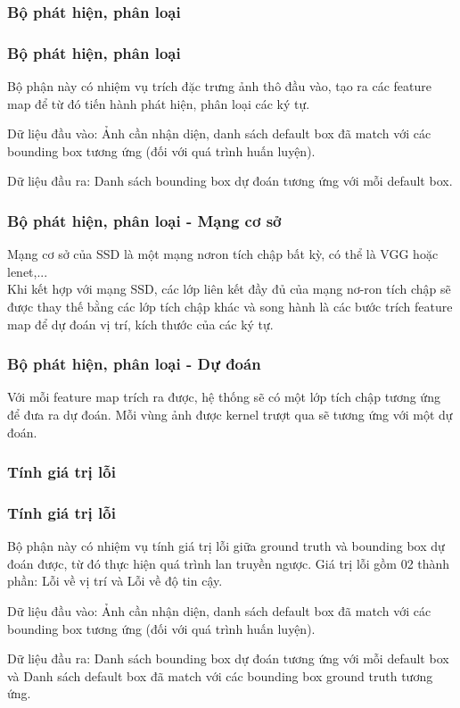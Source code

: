 \documentclass{beamer}
\begin{document}
	
	\subsubsection{Bộ phát hiện, phân loại}
	\begin{frame}
		\frametitle{Bộ phát hiện, phân loại}
		Bộ phận này có nhiệm vụ trích đặc trưng ảnh thô đầu vào, tạo ra các feature map để từ đó tiến hành phát hiện, phân loại các ký tự.
		
		Dữ liệu đầu vào: Ảnh cần nhận diện, danh sách default box đã match với các bounding box tương ứng (đối với quá trình huấn luyện).
		
		Dữ liệu đầu ra: Danh sách bounding box dự đoán tương ứng với mỗi default box.
		
	\end{frame}
	
	\begin{frame}
		\frametitle{Bộ phát hiện, phân loại - Mạng cơ sở}
		Mạng cơ sở của SSD\cite{liu2016ssd} là một mạng nơron tích chập bất kỳ, có thể là VGG\cite{Simonyan14c} hoặc lenet\cite{yanlecun},... \\
		Khi kết hợp với mạng SSD\cite{liu2016ssd}, các lớp liên kết đầy đủ của mạng nơ-ron tích chập sẽ được thay thế bằng các lớp tích chập khác và song hành là các bước trích feature map để dự đoán vị trí, kích thước của các ký tự.
		
	\end{frame}
	
	\begin{frame}
		\frametitle{Bộ phát hiện, phân loại - Dự đoán}
		Với mỗi feature map trích ra được, hệ thống sẽ có một lớp tích chập tương ứng để đưa ra dự đoán. Mỗi vùng ảnh được kernel trượt qua sẽ tương ứng với một dự đoán.	
		
	\end{frame}
	
	\subsubsection{Tính giá trị lỗi}
	\begin{frame}
		\frametitle{Tính giá trị lỗi}
		Bộ phận này có nhiệm vụ tính giá trị lỗi giữa ground truth và bounding box dự đoán được, từ đó thực hiện quá trình lan truyền ngược. Giá trị lỗi gồm 02 thành phần: Lỗi về vị trí và Lỗi về độ tin cậy.
		
		Dữ liệu đầu vào: Ảnh cần nhận diện, danh sách default box đã match với các bounding box tương ứng (đối với quá trình huấn luyện).
		
		Dữ liệu đầu ra: Danh sách bounding box dự đoán tương ứng với mỗi default box và Danh sách default box đã match với các bounding box ground truth tương ứng.
		
	\end{frame}
	
\end{document}
